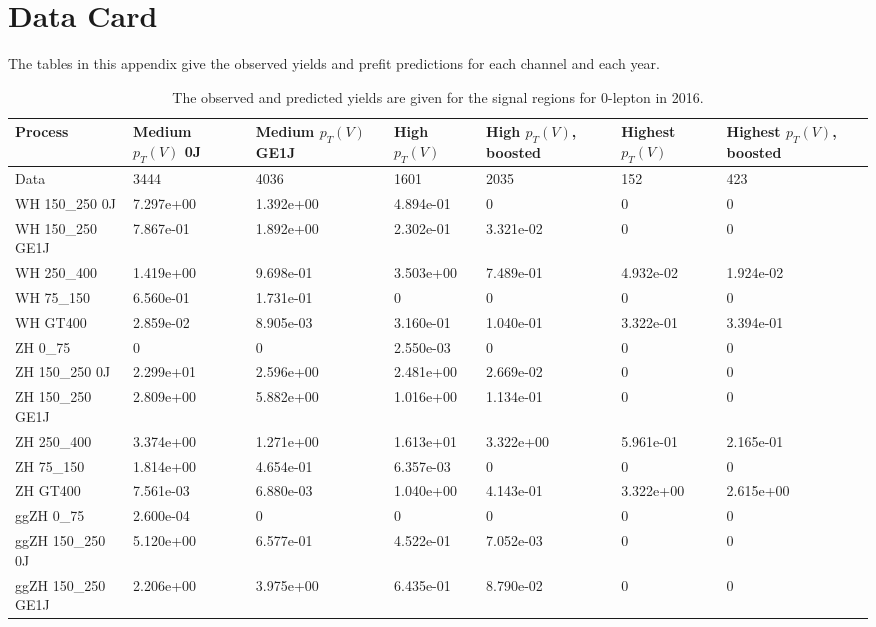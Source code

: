 \chapter{Data Card} \label{app:datacard}


            The tables in this appendix give the observed yields
            and prefit predictions for each channel and each year.
            
\begin{table}
\centering
\caption[2016 0-lepton signal selection yields]{
                  The observed and predicted yields are given for the
                  signal regions for 0-lepton in 2016.
                  }
{\footnotesize
\begin{tabularx}{\textwidth}{|X|X|X|X|X|X|X|}
\hline
Process & Medium $p_{T}(V)$ 0J & Medium $p_{T}(V)$ GE1J & High $p_{T}(V)$ & High $p_{T}(V)$, boosted & Highest $p_{T}(V)$ & Highest $p_{T}(V)$, boosted \\
\hline
Data & 3444 & 4036 & 1601 & 2035 & 152 & 423 \\
\hline
WH 150\_250 0J & 7.297e+00 & 1.392e+00 & 4.894e-01 & 0 & 0 & 0 \\
WH 150\_250 GE1J & 7.867e-01 & 1.892e+00 & 2.302e-01 & 3.321e-02 & 0 & 0 \\
WH 250\_400 & 1.419e+00 & 9.698e-01 & 3.503e+00 & 7.489e-01 & 4.932e-02 & 1.924e-02 \\
WH 75\_150 & 6.560e-01 & 1.731e-01 & 0 & 0 & 0 & 0 \\
WH GT400 & 2.859e-02 & 8.905e-03 & 3.160e-01 & 1.040e-01 & 3.322e-01 & 3.394e-01 \\
ZH 0\_75 & 0 & 0 & 2.550e-03 & 0 & 0 & 0 \\
ZH 150\_250 0J & 2.299e+01 & 2.596e+00 & 2.481e+00 & 2.669e-02 & 0 & 0 \\
ZH 150\_250 GE1J & 2.809e+00 & 5.882e+00 & 1.016e+00 & 1.134e-01 & 0 & 0 \\
ZH 250\_400 & 3.374e+00 & 1.271e+00 & 1.613e+01 & 3.322e+00 & 5.961e-01 & 2.165e-01 \\
ZH 75\_150 & 1.814e+00 & 4.654e-01 & 6.357e-03 & 0 & 0 & 0 \\
ZH GT400 & 7.561e-03 & 6.880e-03 & 1.040e+00 & 4.143e-01 & 3.322e+00 & 2.615e+00 \\
ggZH 0\_75 & 2.600e-04 & 0 & 0 & 0 & 0 & 0 \\
ggZH 150\_250 0J & 5.120e+00 & 6.577e-01 & 4.522e-01 & 7.052e-03 & 0 & 0 \\
ggZH 150\_250 GE1J & 2.206e+00 & 3.975e+00 & 6.435e-01 & 8.790e-02 & 0 & 0 \\

\end{tabularx}}
\end{table}
